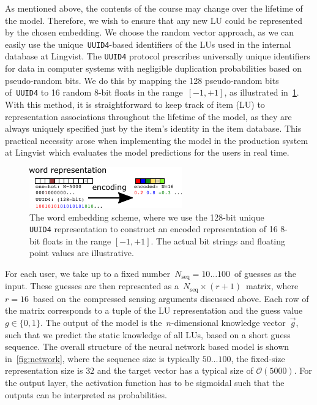 As mentioned above, the contents of the course may change over the lifetime of the model. Therefore, we wish to ensure that any new LU could be represented by the chosen embedding. We choose the random vector approach, as we can easily use the unique~\texttt{UUID4}-based identifiers of the LUs used in the internal database at Lingvist. The \texttt{UUID4} protocol prescribes universally unique identifiers for data in computer systems with negligible duplication probabilities based on pseudo-random bits. We do this by mapping the 128 pseudo-random bits of~\texttt{UUID4} to 16 random 8-bit floats in the range~$[-1, +1]$, as illustrated in~\cref{fig:embedding}. With this method, it is straightforward to keep track of item (LU) to representation associations throughout the lifetime of the model, as they are always uniquely specified just by the item's identity in the item database. This practical necessity arose when implementing the model in the production system at Lingvist which evaluates the model predictions for the users in real time.

\begin{figure}[ht]
\centering
\includegraphics[width=0.7\linewidth]{figures/lingvist/embedding.pdf}
\caption[The word embedding scheme]{The word embedding scheme, where we use the 128-bit unique \texttt{UUID4} representation to construct an encoded representation of 16 8-bit floats in the range $[-1, +1]$. The actual bit strings and floating point values are illustrative.} 
\label{fig:embedding} 
\end{figure} 

For each user, we take up to a fixed number~$N_{\mathrm{seq}} = 10\dots100$~of guesses as the input. These guesses are then represented as a~$N_{\mathrm{seq}} \times (r + 1)$~matrix, where~$r=16$~based on the compressed sensing arguments discussed above. Each row of the matrix corresponds to a tuple of the LU representation and the guess value~$g\in \{0,1\}$. The output of the model is the~$n$-dimensional knowledge vector~$\vec{g}$, such that we predict the static knowledge of all LUs, based on a short guess sequence. The overall structure of the neural network based model is shown in~\cref{fig:network}, where the sequence size is typically $50\dots 100$, the fixed-size representation size is $32$ and the target vector has a typical size of $\mathcal{O}(5000)$. For the output layer, the activation function has to be sigmoidal such that the outputs can be interpreted as probabilities.

